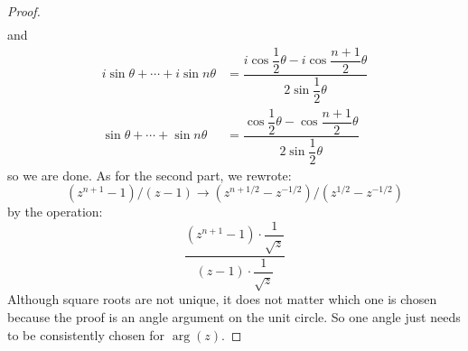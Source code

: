 \documentclass{article}
\begin{document}
\begin{proof}
\begin{align*}
            \end{align*}
        and
            \begin{align*}
                i\sin{\theta} + \cdots + i\sin{n\theta} &= \dfrac{i\cos{\dfrac{1}{2}\theta} - i\cos{\dfrac{n + 1}{2}\theta}}{2 \sin{\dfrac{1}{2}\theta}} \\
                \sin{\theta} + \cdots + \sin{n\theta}   &= \dfrac{\cos{\dfrac{1}{2}\theta} - \cos{\dfrac{n + 1}{2}\theta}}{2 \sin{\dfrac{1}{2}\theta}}     
            \end{align*}
        so we are done. As for the second part, we rewrote:
            \begin{equation*}
                (z^{n + 1} - 1)/(z - 1) \rightarrow (z^{n + 1/2} - z^{-1/2})/(z^{1/2} - z^{-1/2})
            \end{equation*}
        by the operation:
            \begin{equation*}
                \dfrac{(z^{n + 1} - 1) \cdot \dfrac{1}{\sqrt{z}}}{(z - 1) \cdot \dfrac{1}{\sqrt{z}}}
            \end{equation*}
        Although square roots are not unique, it does not matter which one is chosen because the proof is an angle argument on the unit circle. So one angle just needs to be consistently chosen for $\mathop{arg}(z)$.
    \end{proof}

\newpage
\end{document}
